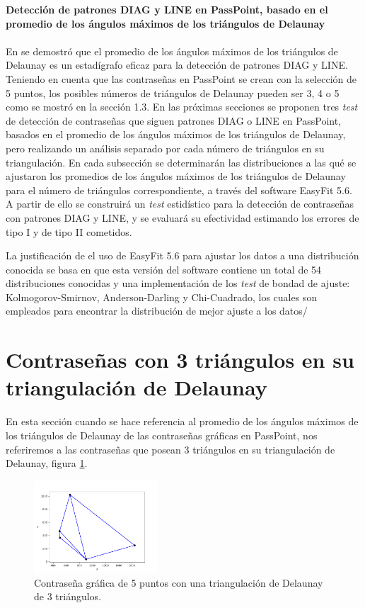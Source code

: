 \documentclass[12pt]{report}
\begin{document}
\vspace{-2em} %

\noindent\textbf{\LARGE Detección de patrones DIAG y LINE en PassPoint, basado en el promedio de los ángulos máximos de los triángulos de Delaunay}\\
\vspace{2em}
\\	
En \cite{13} se demostró que el promedio de los ángulos máximos de los triángulos de Delaunay es un estadígrafo eficaz para la detección de patrones DIAG y LINE. Teniendo en cuenta que las contraseñas en PassPoint se crean con la selección de 5 puntos, los posibles números de triángulos de Delaunay pueden ser 3, 4 o 5 como se mostró en la sección 1.3. En las próximas secciones se proponen tres \textit{test} de detección de contraseñas  que siguen patrones DIAG o LINE en PassPoint, basados en el promedio de los ángulos  máximos de los triángulos de Delaunay, pero  realizando un análisis separado por cada número de triángulos en su triangulación.
En cada subsección se determinarán las distribuciones a las qué se ajustaron los promedios de los ángulos máximos de los triángulos de Delaunay para el número de triángulos correspondiente, a través  del software EasyFit 5.6. A partir de ello se construirá un \textit{test} estidístico para la detección de contraseñas con patrones DIAG y LINE, y se evaluará su efectividad estimando los errores de  tipo I y de tipo II cometidos.

La justificación de el uso de EasyFit 5.6 para ajustar los datos a una distribución conocida se basa en que esta versión del software contiene un total de 54 distribuciones conocidas y una implementación de los \textit{test} de bondad de ajuste:
Kolmogorov-Smirnov, Anderson-Darling y Chi-Cuadrado, los cuales son empleados para encontrar la distribución de mejor ajuste a los datos/


\setcounter{section}{0}
\section{Contraseñas con 3 triángulos en su triangulación de Delaunay }
En esta sección cuando se hace referencia  al promedio de los ángulos máximos de los triángulos de Delaunay  de las contraseñas gráficas en PassPoint, nos referiremos a las contraseñas que posean 3 triángulos en su triangulación de Delaunay, figura \ref{3TD}.
	\begin{figure}[ht]
	\centering
	
	\includegraphics[width=0.41\textwidth]{alea3td.png}
	\caption{Contraseña gráfica de 5 puntos con una triangulación de Delaunay de 3 triángulos.}
	\label{3TD}
\end{figure}
\end{document}
